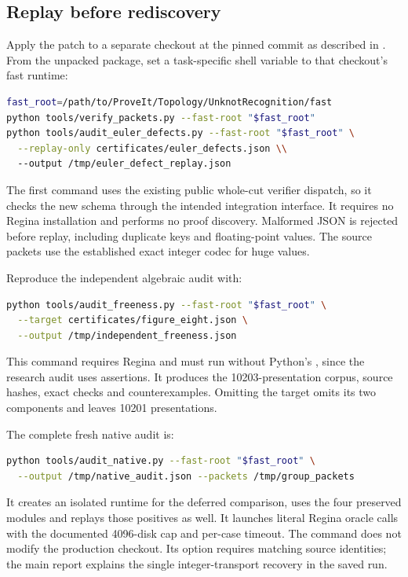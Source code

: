 \subsection{Replay before rediscovery}

Apply the patch to a separate checkout at the pinned commit as described in
. From the unpacked package, set a task-specific shell
variable to that checkout's fast runtime:
\begin{lstlisting}[language=bash]
fast_root=/path/to/ProveIt/Topology/UnknotRecognition/fast
python tools/verify_packets.py --fast-root "$fast_root"
python tools/audit_euler_defects.py --fast-root "$fast_root" \
  --replay-only certificates/euler_defects.json \\
  --output /tmp/euler_defect_replay.json
\end{lstlisting}
The first command uses the existing public whole-cut verifier dispatch, so it
checks the new schema through the intended integration interface. It requires
no Regina installation and performs no proof discovery. Malformed JSON is
rejected before replay, including duplicate keys and floating-point values.
The source packets use the established exact integer codec for huge values.

Reproduce the independent algebraic audit with:
\begin{lstlisting}[language=bash]
python tools/audit_freeness.py --fast-root "$fast_root" \
  --target certificates/figure_eight.json \
  --output /tmp/independent_freeness.json
\end{lstlisting}
This command requires Regina and must run without Python's , since
the research audit uses assertions. It produces the 10203-presentation corpus,
source hashes, exact checks and counterexamples. Omitting the target omits its
two components and leaves 10201 presentations.

The complete fresh native audit is:
\begin{lstlisting}[language=bash]
python tools/audit_native.py --fast-root "$fast_root" \
  --output /tmp/native_audit.json --packets /tmp/group_packets
\end{lstlisting}
It creates an isolated runtime for the deferred comparison, uses the four
preserved modules and replays those positives as well. It launches literal
Regina oracle calls with the documented 4096-disk cap and per-case timeout.
The command does not modify the production checkout. Its 
option requires matching source identities; the main report explains the
single integer-transport recovery in the saved run.

